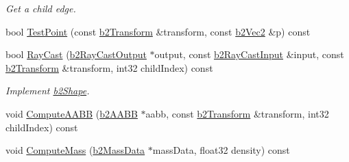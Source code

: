 \begin{DoxyCompactItemize}
\begin{DoxyCompactList}\small\item\em Get a child edge. \end{DoxyCompactList}\item 
bool \hyperlink{classb2_chain_shape_a4fc27b41ecc556985efacf8e0f91c39f}{Test\-Point} (const \hyperlink{structb2_transform}{b2\-Transform} \&transform, const \hyperlink{structb2_vec2}{b2\-Vec2} \&p) const 
\item 
\hypertarget{classb2_chain_shape_a85c7a17a15581e0e258c7af561cf5403}{bool \hyperlink{classb2_chain_shape_a85c7a17a15581e0e258c7af561cf5403}{Ray\-Cast} (\hyperlink{structb2_ray_cast_output}{b2\-Ray\-Cast\-Output} $\ast$output, const \hyperlink{structb2_ray_cast_input}{b2\-Ray\-Cast\-Input} \&input, const \hyperlink{structb2_transform}{b2\-Transform} \&transform, int32 child\-Index) const }\label{classb2_chain_shape_a85c7a17a15581e0e258c7af561cf5403}

\begin{DoxyCompactList}\small\item\em Implement \hyperlink{classb2_shape}{b2\-Shape}. \end{DoxyCompactList}\item 
void \hyperlink{classb2_chain_shape_a409c21206e4c84f66700809aac5b164c}{Compute\-A\-A\-B\-B} (\hyperlink{structb2_a_a_b_b}{b2\-A\-A\-B\-B} $\ast$aabb, const \hyperlink{structb2_transform}{b2\-Transform} \&transform, int32 child\-Index) const 
\item 
void \hyperlink{classb2_chain_shape_a009259d589abebeda27fe580d117b11e}{Compute\-Mass} (\hyperlink{structb2_mass_data}{b2\-Mass\-Data} $\ast$mass\-Data, float32 density) const 
\end{DoxyCompactItemize}

